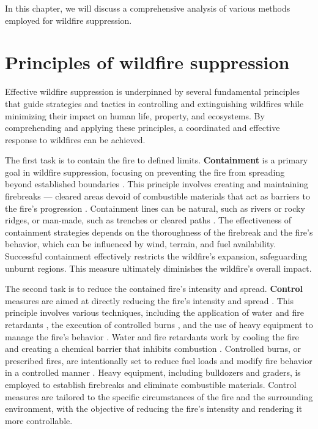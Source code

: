 \documentclass[
  12 pt,
]{Nemilov}
\begin{document}
In this chapter, we will discuss a comprehensive analysis of various methods employed for wildfire suppression.

\section{Principles of wildfire suppression}\label{principles-of-wildfire-suppression}

Effective wildfire suppression is underpinned by several fundamental principles that guide strategies and tactics in controlling and extinguishing wildfires while minimizing their impact on human life, property, and ecosystems. By comprehending and applying these principles, a coordinated and effective response to wildfires can be achieved.

The first task is to contain the fire to defined limits. \textbf{Containment} is a primary goal in wildfire suppression, focusing on preventing the fire from spreading beyond established boundaries \citep{fried1996simulating, hu2009integrated}. This principle involves creating and maintaining firebreaks --- cleared areas devoid of combustible materials that act as barriers to the fire's progression \citep{ascoli2020firebreak, plucinski2019fighting}. Containment lines can be natural, such as rivers or rocky ridges, or man-made, such as trenches or cleared paths \citep{plucinski2019contain}. The effectiveness of containment strategies depends on the thoroughness of the firebreak and the fire's behavior, which can be influenced by wind, terrain, and fuel availability. Successful containment effectively restricts the wildfire's expansion, safeguarding unburnt regions. This measure ultimately diminishes the wildfire's overall impact.

The second task is to reduce the contained fire's intensity and spread. \textbf{Control} measures are aimed at directly reducing the fire's intensity and spread \citep{plucinski2019contain}. This principle involves various techniques, including the application of water and fire retardants \citep{underwood2012wildfire}, the execution of controlled burns \citep{miller2020barriers, wagle1979controlled}, and the use of heavy equipment to manage the fire's behavior \citep{lueck2013economics}. Water and fire retardants work by cooling the fire and creating a chemical barrier that inhibits combustion \citep{grant2000fire, green1995overview, hua2002numerical, mawhinney1994closer}. Controlled burns, or prescribed fires, are intentionally set to reduce fuel loads and modify fire behavior in a controlled manner \citep{francos2021prescribed, yoder2004liability}. Heavy equipment, including bulldozers and graders, is employed to establish firebreaks and eliminate combustible materials. Control measures are tailored to the specific circumstances of the fire and the surrounding environment, with the objective of reducing the fire's intensity and rendering it more controllable.
\end{document}
